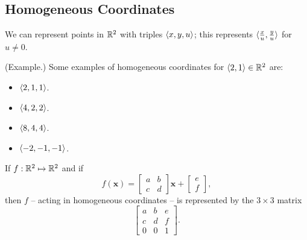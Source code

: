 \documentclass[letterpaper]{article}
\begin{document}
\subsection{Homogeneous Coordinates}
We can represent points in $\mathbb{R}^2$ with triples $\langle x, y, u \rangle$; this represents $\langle \frac{x}{u}, \frac{y}{u} \rangle$ for $u \neq 0$. 

\begin{mdframed}[]
    (Example.) Some examples of homogeneous coordinates for $\langle 2, 1 \rangle \in \mathbb{R}^2$ are: 
    \begin{itemize}
        \item $\langle 2, 1, 1 \rangle$. 
        \item $\langle 4, 2, 2 \rangle$. 
        \item $\langle 8, 4, 4 \rangle$. 
        \item $\langle -2, -1, -1 \rangle$. 
    \end{itemize}
\end{mdframed}

If $f: \mathbb{R}^2 \mapsto \mathbb{R}^2$ and if
\[f(\mathbf{x}) = \begin{bmatrix}
    a & b \\ c & d
\end{bmatrix} \mathbf{x} + \begin{bmatrix}
    e \\ f 
\end{bmatrix},\]
then $f$ -- acting in homogeneous coordinates -- is represented by the $3 \times 3$ matrix 
\[\begin{bmatrix}
    a & b & e \\ c & d & f \\ 0 & 0 & 1
\end{bmatrix}.\]
\end{document}
